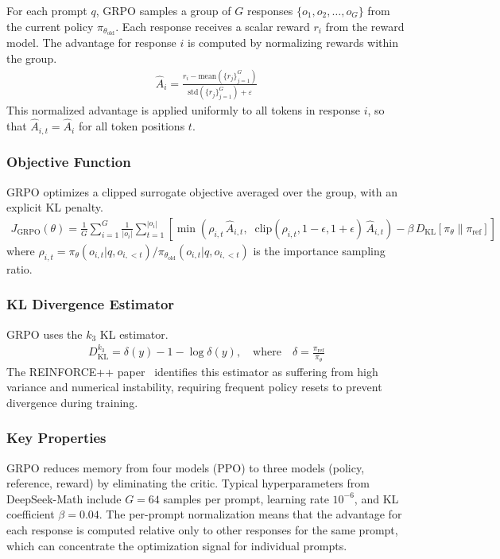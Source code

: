 \documentclass[12pt]{article}
\begin{document}
For each prompt $q$, GRPO samples a group of $G$ responses $\{o_1, o_2, \ldots, o_G\}$ from the current policy $\pi_{\theta_{\text{old}}}$. Each response receives a scalar reward $r_i$ from the reward model. The advantage for response $i$ is computed by normalizing rewards within the group.
\begin{align}
\hat{A}_i = \frac{r_i - \text{mean}(\{r_j\}_{j=1}^G)}{\text{std}(\{r_j\}_{j=1}^G) + \varepsilon}
\end{align}
This normalized advantage is applied uniformly to all tokens in response $i$, so that $\hat{A}_{i,t} = \hat{A}_i$ for all token positions $t$.

\subsubsection{Objective Function}

GRPO optimizes a clipped surrogate objective averaged over the group, with an explicit KL penalty.
\begin{align}
J_{\text{GRPO}}(\theta) = \frac{1}{G} \sum_{i=1}^{G} \frac{1}{|o_i|} \sum_{t=1}^{|o_i|} \left[ \min\!\left( \rho_{i,t} \, \hat{A}_{i,t}, \;\; \text{clip}(\rho_{i,t}, 1{-}\epsilon, 1{+}\epsilon) \, \hat{A}_{i,t} \right) - \beta \, D_{\text{KL}}[\pi_\theta \| \pi_{\text{ref}}] \right]
\end{align}
where $\rho_{i,t} = \pi_\theta(o_{i,t} | q, o_{i,<t}) / \pi_{\theta_{\text{old}}}(o_{i,t} | q, o_{i,<t})$ is the importance sampling ratio.

\subsubsection{KL Divergence Estimator}

GRPO uses the $k_3$ KL estimator.
\begin{align}
D_{\text{KL}}^{k_3} = \delta(y) - 1 - \log \delta(y), \quad \text{where} \quad \delta = \frac{\pi_{\text{ref}}}{\pi_\theta}
\end{align}
The REINFORCE++ paper~\cite{Hu2025Reinforce} identifies this estimator as suffering from high variance and numerical instability, requiring frequent policy resets to prevent divergence during training.

\subsubsection{Key Properties}

GRPO reduces memory from four models (PPO) to three models (policy, reference, reward) by eliminating the critic. Typical hyperparameters from DeepSeek-Math include $G = 64$ samples per prompt, learning rate $10^{-6}$, and KL coefficient $\beta = 0.04$. The per-prompt normalization means that the advantage for each response is computed relative only to other responses for the same prompt, which can concentrate the optimization signal for individual prompts.
\end{document}

